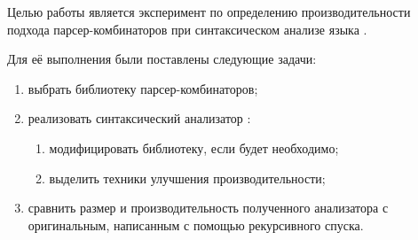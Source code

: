 Целью работы является эксперимент по определению производительности подхода
парсер-комбинаторов при синтаксическом анализе языка \rescript.

\noindent
Для её выполнения были поставлены следующие задачи:
\begin{enumerate}
    \item выбрать библиотеку парсер-комбинаторов;
    \item реализовать синтаксический анализатор \rescript:
        \begin{enumerate}
            \item модифицировать библиотеку, если будет необходимо;
            \item выделить техники улучшения производительности;
        \end{enumerate}
    \item сравнить размер и производительность полученного анализатора с оригинальным, написанным с помощью рекурсивного спуска.
\end{enumerate}
